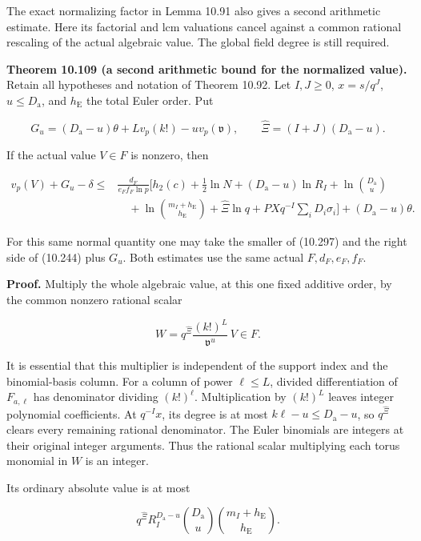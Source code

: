 \documentclass[
  11pt,
  a4paper,
]{article}
\begin{document}
The exact normalizing factor in Lemma 10.91 also gives a second
arithmetic estimate. Here its factorial and lcm valuations cancel
against a common rational rescaling of the actual algebraic value. The
global field degree is still required.

\textbf{Theorem 10.109 (a second arithmetic bound for the normalized
value).} Retain all hypotheses and notation of Theorem 10.92. Let
\(I,J\ge0\), \(x=s/q^J\), \(u\le D_{\mathrm a}\), and \(h_{\mathrm E}\)
the total Euler order. Put

\[
G_u=(D_{\mathrm a}-u)\theta+Lv_p(k!)-uv_p(\mathfrak v),
\qquad
\widehat\Xi=(I+J)(D_{\mathrm a}-u).
\tag{10.296}
\]

If the actual value \(V\in F\) is nonzero, then

\[
\begin{aligned}
v_p(V)+G_u-\delta\le{}&
\frac{d_F}{e_Ff_F\ln p}\biggl[
h_2(c)+\tfrac12\ln N
 +(D_{\mathrm a}-u)\ln R_I
 +\ln\binom{D_{\mathrm a}}u\\
&\quad{}+\ln\binom{m_I+h_{\mathrm E}}{h_{\mathrm E}}
 +\widehat\Xi\ln q
 +PXq^{-I}\sum_iD_i\sigma_i\biggr]
 +(D_{\mathrm a}-u)\theta.
\end{aligned}
\tag{10.297}
\]

For this same normal quantity one may take the smaller of (10.297) and
the right side of (10.244) plus \(G_u\). Both estimates use the same
actual \(F,d_F,e_F,f_F\).

\textbf{Proof.} Multiply the whole algebraic value, at this one fixed
additive order, by the common nonzero rational scalar

\[
W=q^{\widehat\Xi}\frac{(k!)^L}{\mathfrak v^u}\,V\in F.
\tag{10.298}
\]

It is essential that this multiplier is independent of the support index
and the binomial-basis column. For a column of power \(\ell\le L\),
divided differentiation of \(F_{a,\ell}\) has denominator dividing
\((k!)^\ell\). Multiplication by \((k!)^L\) leaves integer polynomial
coefficients. At \(q^{-I}x\), its degree is at most
\(k\ell-u\le D_{\mathrm a}-u\), so \(q^{\widehat\Xi}\) clears every
remaining rational denominator. The Euler binomials are integers at
their original integer arguments. Thus the rational scalar multiplying
each torus monomial in \(W\) is an integer.

Its ordinary absolute value is at most

\[
q^{\widehat\Xi}R_I^{D_{\mathrm a}-u}
\binom{D_{\mathrm a}}u
\binom{m_I+h_{\mathrm E}}{h_{\mathrm E}}.
\]
\end{document}
